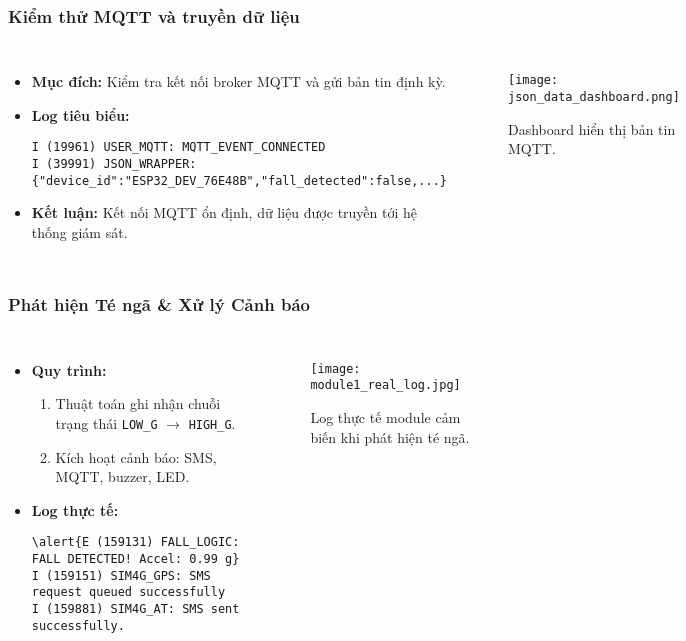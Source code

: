 \begin{frame}[t,fragile]
\frametitle{Kiểm thử MQTT và truyền dữ liệu}
\begin{columns}[T]
    \begin{itemize}
        \item \textbf{Mục đích:} Kiểm tra kết nối broker MQTT và gửi bản tin định kỳ.
        \item \textbf{Log tiêu biểu:}
        \begin{verbatim}
I (19961) USER_MQTT: MQTT_EVENT_CONNECTED
I (39991) JSON_WRAPPER: {"device_id":"ESP32_DEV_76E48B","fall_detected":false,...}
        \end{verbatim}
        \item \textbf{Kết luận:} Kết nối MQTT ổn định, dữ liệu được truyền tới hệ thống giám sát.
    \end{itemize}
    \begin{figure}
        \centering
        \texttt{[image: json\_data\_dashboard.png]}
        \caption{Dashboard hiển thị bản tin MQTT.}
    \end{figure}
\end{columns}
\end{frame}

\begin{frame}[t,fragile]
\frametitle{Phát hiện Té ngã \& Xử lý Cảnh báo}
\begin{columns}[T]
    \begin{itemize}
        \item \textbf{Quy trình:}
        \begin{enumerate}
            \item Thuật toán ghi nhận chuỗi trạng thái \texttt{LOW\_G} $\to$ \texttt{HIGH\_G}.
            \item Kích hoạt cảnh báo: SMS, MQTT, buzzer, LED.
        \end{enumerate}
        \item \textbf{Log thực tế:}
        \begin{verbatim}
\alert{E (159131) FALL_LOGIC: FALL DETECTED! Accel: 0.99 g}
I (159151) SIM4G_GPS: SMS request queued successfully
I (159881) SIM4G_AT: SMS sent successfully.
        \end{verbatim}
    \end{itemize}
    \begin{figure}
        \centering
        \texttt{[image: module1\_real\_log.jpg]}
        \caption{Log thực tế module cảm biến khi phát hiện té ngã.}
    \end{figure}
\end{columns}
\end{frame}


